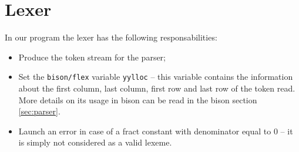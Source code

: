 \section{Lexer}
In our program the lexer has the following responsabilities:
\begin{itemize}
\item Produce the token stream for the parser;
\item Set the \verb|bison/flex| variable \verb|yylloc| -- this 
variable contains the information about the first column, last column,
first row and last row of the token read. More details on its usage in
bison can be read in the bison section \ref{sec:parser}.
\item Launch an error in case of a fract constant with denominator equal
to $0$ -- it is simply not considered as a valid lexeme.
\end{itemize}
